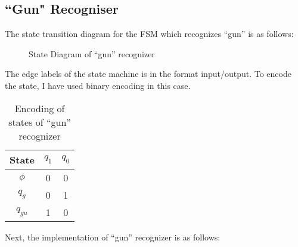 \documentclass[12pt]{article}
\begin{document}
\subsection{``Gun" Recogniser}
The state transition diagram for the FSM which recognizes ``gun'' is as follows:
\begin{figure}[H] %
    \centering %
    \caption{State Diagram of ``gun'' recognizer}
\end{figure}
The edge labels of the state machine is in the format input/output.
To encode the state, I have used binary encoding in this case.
\begin{table}[H]
	\centering
	\begin{tabular}{|c|c|c|}
	\hline
	\textbf{State} 	& $q_1$	& $q_0$ \\
	\hline
	$\phi$	& 0 	& 0		\\
	$q_g$	& 0 	& 1		\\
	$q_{gu}$& 1 	& 0		\\
	\hline
	\end{tabular}
	\caption{Encoding of states of ``gun'' recognizer}
\end{table}

Next, the implementation of ``gun'' recognizer is as follows:

\inputminted[bgcolor=LightGray]{vhdl}{code/gun_recog.vhd}
\end{document}
